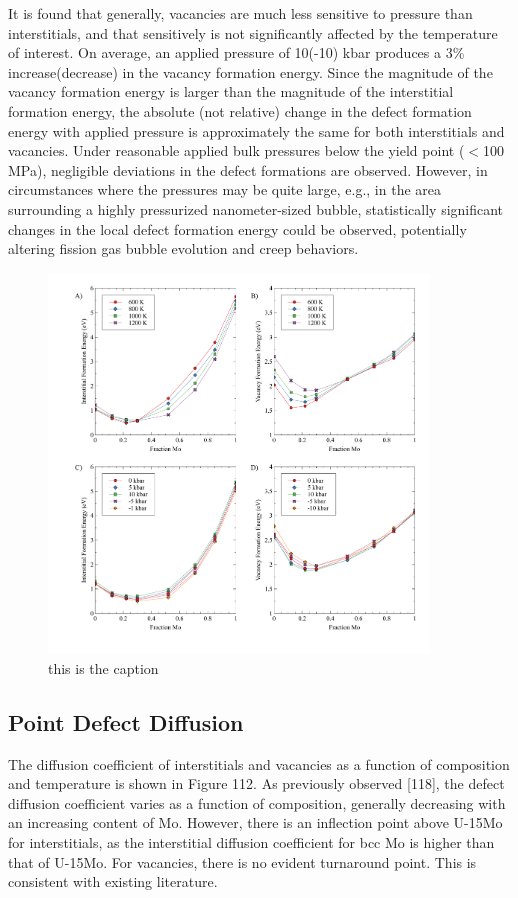 \documentclass[default]{sn-jnl}%
\begin{document}
It is found that generally, vacancies are much less sensitive to pressure than interstitials, and that sensitively is not significantly affected by the temperature of interest. On average, an applied pressure of 10(-10) kbar produces a 3\% increase(decrease) in the vacancy formation energy. Since the magnitude of the vacancy formation energy is larger than the magnitude of the interstitial formation energy, the absolute (not relative) change in the defect formation energy with applied pressure is approximately the same for both interstitials and vacancies. Under reasonable applied bulk pressures below the yield point ($<$100 MPa), negligible deviations in the defect formations are observed. However, in circumstances where the pressures may be quite large, e.g., in the area surrounding a highly pressurized nanometer-sized bubble, statistically significant changes in the local defect formation energy could be observed, potentially altering fission gas bubble evolution and creep behaviors.

\begin{figure}[htbp]
\begin{center}
\includegraphics[width=0.9\textwidth]{figA.pdf} 
\caption{this is the caption}
\label{fig:A}
\end{center}
\end{figure}

\subsection{Point Defect Diffusion}
The diffusion coefficient of interstitials and vacancies as a function of composition and temperature is shown in Figure 112. As previously observed [118], the defect diffusion coefficient varies as a function of composition, generally decreasing with an increasing content of Mo. However, there is an inflection point above U-15Mo for interstitials, as the interstitial diffusion coefficient for bcc Mo is higher than that of U-15Mo. For vacancies, there is no evident turnaround point. This is consistent with existing literature. 
\end{document}
